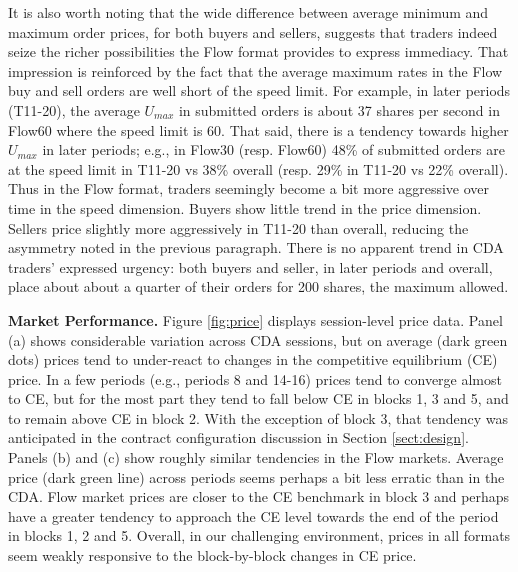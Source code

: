 \documentclass[12pt]{article}
\begin{document}
It is also worth noting that the wide difference between average minimum and maximum order prices, for both buyers and sellers, suggests that traders indeed seize the richer possibilities the Flow format provides to express immediacy. 
That impression is reinforced by the fact that the average maximum rates in the Flow buy and sell orders are well short of the speed limit. 
For example, in later periods (T11-20), the average $U_{max}$ in submitted orders is about 37 shares per second in Flow60 where the speed limit is 60. 
That said, there is a tendency towards higher $U_{max}$ in later periods;
e.g., in Flow30 (resp. Flow60) 48\% of submitted orders are at the speed limit in T11-20 vs 38\% overall (resp. 29\% in T11-20 vs 22\% overall).
Thus in the Flow format, traders seemingly become a bit more aggressive over time in the speed dimension. Buyers show little trend in the price dimension.
Sellers price slightly more aggressively in T11-20 than overall,
reducing the asymmetry noted in the previous paragraph.
There is no apparent trend in CDA traders' expressed urgency: both buyers and seller, in later periods and overall, place about about a quarter of their orders for 200 shares, the maximum allowed.

\vspace{0.5cm}
\noindent \textbf{Market Performance.} 
Figure \ref{fig:price} displays session-level price data. Panel (a)
shows considerable variation across CDA sessions, but on average (dark green dots) prices tend to under-react to changes in the competitive equilibrium (CE) price. 
In a few periods (e.g., periods 8 and 14-16) prices tend to converge almost to CE, but for the most part they tend to fall below CE in blocks 1, 3 and 5, and to remain above CE in block 2. 
With the exception of block 3, that tendency was anticipated in the contract configuration discussion in Section \ref{sect:design}.
Panels (b) and (c) show roughly similar tendencies in the Flow markets. 
Average price (dark green line) across periods seems perhaps a bit less erratic than in the CDA.
Flow market prices are closer to the CE benchmark in block 3 
and perhaps have a greater tendency to approach the CE level towards the end of the period in blocks 1, 2 and 5. 
Overall, in our challenging environment, 
prices in all formats seem weakly responsive to the block-by-block changes in CE price. 
\end{document}
